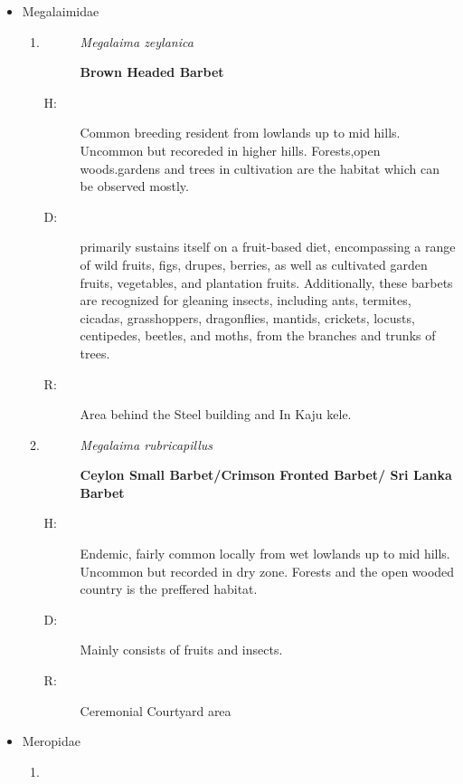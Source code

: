 \begin{itemize}
\begin{enumerate}
\end{enumerate}%
\item%
Megalaimidae%
\begin{enumerate}%
\item%
\begin{description}%
\item[]%
\textit{Megalaima zeylanica}%
\item[]%
\textbf{Brown Headed Barbet}%
\end{description}%
\begin{description}%
\item[H: ]%
Common breeding resident from lowlands up to mid hills. Uncommon but recoreded in higher hills. Forests,open woods.gardens and trees in cultivation are the habitat which can be observed mostly. %
\item[D: ]%
primarily sustains itself on a fruit{-}based diet, encompassing a range of wild fruits, figs, drupes, berries, as well as cultivated garden fruits, vegetables, and plantation fruits. Additionally, these barbets are recognized for gleaning insects, including ants, termites, cicadas, grasshoppers, dragonflies, mantids, crickets, locusts, centipedes, beetles, and moths, from the branches and trunks of trees.%
\item[R: ]%
Area behind the Steel building and In Kaju kele. %
\end{description}%
\item%
\begin{description}%
\item[]%
\textit{Megalaima rubricapillus}%
\item[]%
\textbf{Ceylon Small Barbet/Crimson Fronted Barbet/ Sri Lanka Barbet}%
\end{description}%
\begin{description}%
\item[H: ]%
Endemic, fairly common locally from wet lowlands up to mid hills. Uncommon but recorded in dry zone. Forests and the open wooded country is the preffered habitat.%
\item[D: ]%
Mainly consists of fruits and insects.%
\item[R: ]%
Ceremonial Courtyard area%
\end{description}%
\end{enumerate}%
\item%
Meropidae%
\begin{enumerate}%
\item%
\begin{description}%
\item[]%

\end{description}
\end{enumerate}
\end{itemize}

